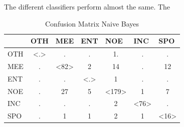 \documentclass[
10pt, %
a4paper, %
oneside, %
headinclude,footinclude, %
BCOR5mm, %
]{scrartcl}
\begin{document}
The different classifiers perform almost the same. The 

\begin{table}[h]
\caption[Confusion Matrix Naive Bayes]{Confusion Matrix Naive Bayes }
\begin{tabular}{|l|c|c|c|c|c|c|}
\hline
    & \multicolumn{1}{l|}{OTH} & \multicolumn{1}{l|}{MEE} & \multicolumn{1}{l|}{ENT} & \multicolumn{1}{l|}{NOE} & \multicolumn{1}{l|}{INC} & \multicolumn{1}{l|}{SPO} \\ \hline
OTH & \textless.\textgreater   & .                        & .                        & 1.                       & .                        & .                        \\ \hline
MEE & .                        & \textless82\textgreater  & 2                        & 14                       & .                        & 12                       \\ \hline
ENT & .                        & .                        & \textless.\textgreater   & 1                        & .                        & .                        \\ \hline
NOE & .                        & 27                       & 5                        & \textless179\textgreater & 1                        & 7                        \\ \hline
INC & .                        & .                        & .                        & 2                        & \textless76\textgreater  & .                        \\ \hline
SPO & .                        & 1                        & 1                        & 2                        & 1                        & \textless16\textgreater  \\ \hline
\end{tabular}


\end{table}
\end{document}
